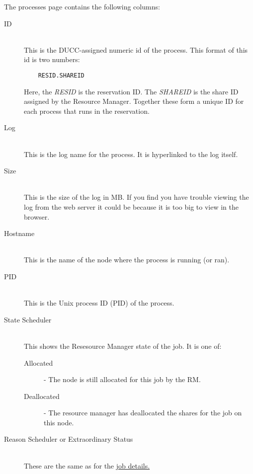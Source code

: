    The processes page contains the following columns:
   \begin{description}
      \item[ID] \hfill \\
        This is the DUCC-assigned numeric id of the process.  This format of this
        id is two numbers:
\begin{verbatim}
    RESID.SHAREID
\end{verbatim}
        Here, the {\em RESID} is the reservation ID.  The {\em SHAREID} is the 
        share ID assigned by the Resource Manager.  Together these form a unique
        ID for each process that runs in the reservation.
                
      \item[Log] \hfill \\
        This is the log name for the process. It is hyperlinked to the log itself.
        
      \item[Size] \hfill \\
        This is the size of the log in MB. If you find you have trouble viewing the log
        from the web server it could be because it is too big to view in the browser.
        
      \item[Hostname] \hfill \\
        This is the name of the node where the process is running (or ran).
        
      \item[PID] \hfill \\
        This is the Unix process ID (PID) of the process.
        
      \item[State Scheduler] \hfill \\
        This shows the Resesource Manager state of the job. It is one of:
        
        \begin{description}
            \item[Allocated] - The node is still allocated for this job by the RM.
            \item[Deallocated] - The resource manager has deallocated the shares for the job on
              this node.
        \end{description}
        
      \item[Reason Scheduler or Extraordinary Status] \hfill \\
        These are the same as for the \hyperref[itm:job-details-sched]{job details.}


\end{description}
